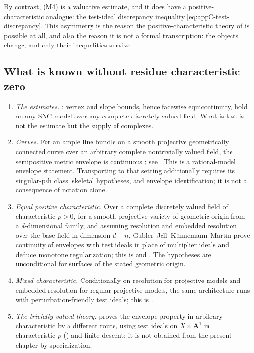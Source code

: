 By contrast, (M4) is a valuative estimate, and it does have a
positive-characteristic analogue: the test-ideal discrepancy inequality
\eqref{eq:appC-test-discrepancy}.  This asymmetry is the reason the
positive-characteristic theory of  is possible at
all, and also the reason it is not a formal transcription: the objects
change, and only their inequalities survive.

\subsection{What is known without residue characteristic zero}

\begin{enumerate}
\item \emph{The estimates.}  :
vertex and slope bounds, hence facewise equicontinuity, hold on any SNC
model over any complete discretely valued field.  What is lost is not the
estimate but the supply of complexes.
\item \emph{Curves.}  For an ample line bundle on a smooth projective
geometrically connected curve over an arbitrary complete nontrivially
valued field, the semipositive metric envelope is continuous
\cite[Theorem~1.1]{GJKM19}; see
.  This is a rational-model
envelope statement.  Transporting
 to that setting additionally
requires its singular-psh class, skeletal hypotheses, and envelope
identification; it is not a consequence of notation alone.
\item \emph{Equal positive characteristic.}  Over a complete discretely
valued field of characteristic $p>0$, for a smooth projective variety of
geometric origin from a $d$-dimensional family, and assuming resolution
and embedded resolution over the base field in dimension $d+n$,
Gubler--Jell--K\"unnemann--Martin prove continuity of envelopes with test
ideals in place of multiplier ideals and deduce monotone regularization;
this is  and \cite{GJKM19}.  The
hypotheses are unconditional for surfaces of the stated geometric origin.
\item \emph{Mixed characteristic.}  Conditionally on resolution for
projective models and embedded resolution for regular projective models,
the same architecture runs with perturbation-friendly test ideals; this is
.
\item \emph{The trivially valued theory.}   proves the
envelope property in arbitrary characteristic by a different route, using
test ideals on $X\times\mathbf A^1$ in characteristic $p$
() and finite descent; it is not
obtained from the present chapter by specialization.
\end{enumerate}

